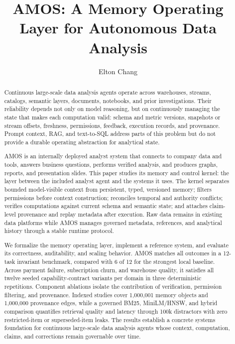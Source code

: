 \documentclass[10pt]{article}
\title{AMOS: A Memory Operating Layer for Autonomous Data Analysis}
\author{Elton Chang}
\date{}
\newcommand{\amos}{\textsc{AMOS}\xspace}
\begin{document}
\maketitle

\begin{abstract}
Continuous large-scale data analysis agents operate across warehouses, streams, catalogs, semantic layers, documents, notebooks, and prior investigations. Their reliability depends not only on model reasoning, but on continuously managing the state that makes each computation valid: schema and metric versions, snapshots or stream offsets, freshness, permissions, feedback, execution records, and provenance. Prompt context, RAG, and text-to-SQL address parts of this problem but do not provide a durable operating abstraction for analytical state.

\amos is an internally deployed analyst system that connects to company data and tools, answers business questions, performs verified analysis, and produces graphs, reports, and presentation slides. This paper studies its memory and control kernel: the layer between the included analyst agent and the systems it uses. The kernel separates bounded model-visible context from persistent, typed, versioned memory; filters permissions before context construction; reconciles temporal and authority conflicts; verifies computations against current schema and semantic state; and attaches claim-level provenance and replay metadata after execution. Raw data remains in existing data platforms while \amos manages governed metadata, references, and analytical history through a stable runtime protocol.

We formalize the memory operating layer, implement a reference system, and evaluate its correctness, auditability, and scaling behavior. \amos matches all outcomes in a 12-task invariant benchmark, compared with 6 of 12 for the strongest local baseline. Across payment failure, subscription churn, and warehouse quality, it satisfies all twelve seeded capability-contract variants per domain in three deterministic repetitions. Component ablations isolate the contribution of verification, permission filtering, and provenance. Indexed studies cover 1{,}000{,}001 memory objects and 1{,}000{,}000 provenance edges, while a governed BM25, MiniLM/HNSW, and hybrid comparison quantifies retrieval quality and latency through 100k distractors with zero restricted-item or superseded-item leaks. The results establish a concrete systems foundation for continuous large-scale data analysis agents whose context, computation, claims, and corrections remain governable over time.
\end{abstract}
\end{document}
